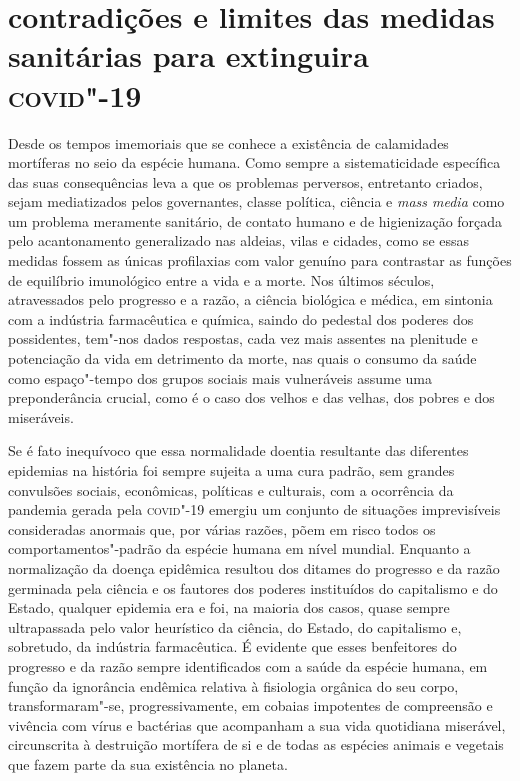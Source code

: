 
\section{contradições e limites das medidas sanitárias para extinguira
\textsc{covid}"-19}

\noindent{}Desde os tempos imemoriais que se conhece a existência de calamidades
mortíferas no seio da espécie humana. Como sempre a sistematicidade
específica das suas consequências leva a que os problemas perversos,
entretanto criados, sejam mediatizados pelos governantes, classe
política, ciência e \emph{mass media} como um problema meramente
sanitário, de contato humano e de higienização forçada pelo
acantonamento generalizado nas aldeias, vilas e cidades, como se essas
medidas fossem as únicas profilaxias com valor genuíno para contrastar
as funções de equilíbrio imunológico entre a vida e a morte. Nos últimos
séculos, atravessados pelo progresso e a razão, a ciência biológica e
médica, em sintonia com a indústria farmacêutica e química, saindo do
pedestal dos poderes dos possidentes, tem"-nos dados respostas, cada vez
mais assentes na plenitude e potenciação da vida em detrimento da morte,
nas quais o consumo da saúde como espaço"-tempo dos grupos sociais mais
vulneráveis assume uma preponderância crucial, como é o caso dos velhos
e das velhas, dos pobres e dos miseráveis.

Se é fato inequívoco que essa normalidade doentia resultante das
diferentes epidemias na história foi sempre sujeita a uma cura padrão,
sem grandes convulsões sociais, econômicas, políticas e culturais, com a
ocorrência da pandemia gerada pela \textsc{covid}"-19 emergiu um conjunto de
situações imprevisíveis consideradas anormais que, por várias razões,
põem em risco todos os comportamentos"-padrão da espécie humana em nível
mundial. Enquanto a normalização da doença epidêmica resultou dos
ditames do progresso e da razão germinada pela ciência e os fautores dos
poderes instituídos do capitalismo e do Estado, qualquer epidemia era e
foi, na maioria dos casos, quase sempre ultrapassada pelo valor
heurístico da ciência, do Estado, do capitalismo e, sobretudo, da
indústria farmacêutica. É evidente que esses benfeitores do progresso e
da razão sempre identificados com a saúde da espécie humana, em função
da ignorância endêmica relativa à fisiologia orgânica do seu corpo,
transformaram"-se, progressivamente, em cobaias impotentes de compreensão
e vivência com vírus e bactérias que acompanham a sua vida quotidiana
miserável, circunscrita à destruição mortífera de si e de todas as
espécies animais e vegetais que fazem parte da sua existência no
planeta.

